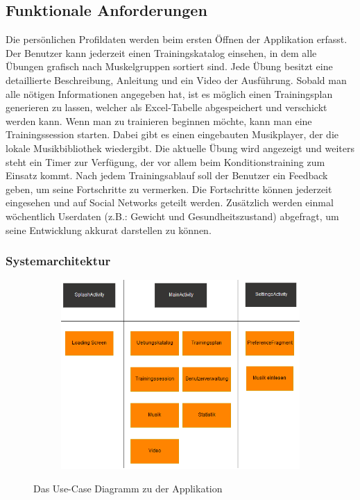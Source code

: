 \documentclass[FIPLY_base.tex]{subfiles}
\begin{document}
	\subsection{Funktionale Anforderungen}
	Die persönlichen Profildaten werden beim ersten Öffnen der Applikation erfasst. Der Benutzer kann jederzeit einen Trainingskatalog einsehen, in dem alle Übungen grafisch nach Muskelgruppen sortiert sind. Jede Übung besitzt eine detaillierte Beschreibung, Anleitung und ein Video der Ausführung. Sobald man alle nötigen Informationen angegeben hat, ist es möglich einen Trainingsplan generieren zu lassen, welcher  als Excel-Tabelle abgespeichert und verschickt werden kann. Wenn man zu trainieren beginnen möchte, kann man eine Trainingssession starten. Dabei gibt es einen eingebauten Musikplayer, der die lokale Musikbibliothek wiedergibt. Die aktuelle Übung wird angezeigt und weiters steht ein Timer zur Verfügung, der vor allem beim Konditionstraining zum Einsatz kommt. Nach jedem Trainingsablauf soll der Benutzer ein Feedback geben, um seine Fortschritte zu vermerken. Die Fortschritte können jederzeit eingesehen und auf Social Networks geteilt werden. Zusätzlich werden einmal wöchentlich Userdaten (z.B.: Gewicht und Gesundheitszustand) abgefragt, um seine Entwicklung akkurat darstellen zu können.
	
	\subsubsection{Systemarchitektur}
	\begin{figure}[H]
		\begin{subfigure}[b]{0.3\textwidth}
			\centering
			\includegraphics[scale=0.6]{img/Systemarchitektur}
		\end{subfigure}
		\caption{Das Use-Case Diagramm zu der Applikation}
	\end{figure}
	\newpage
\end{document}
